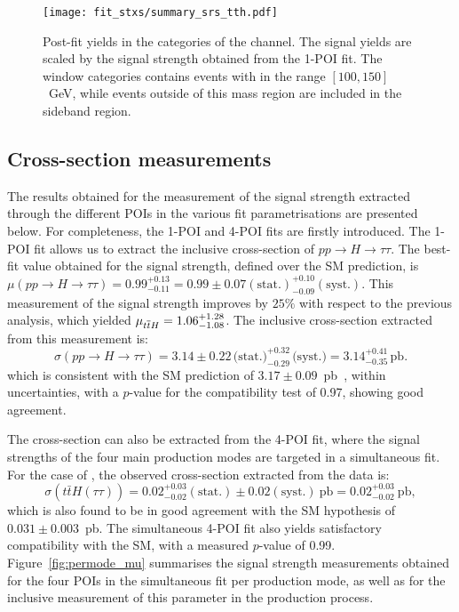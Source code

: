 \begin{figure}[htbp]
  \centering
  \texttt{[image: fit\_stxs/summary\_srs\_tth.pdf]}
  \caption{Post-fit yields in the \ttH categories of the \tauhadhad channel. The
  signal yields are scaled by the signal strength obtained from the 1-POI fit. The
  window categories contains events with \mtt in the range $[100, 150]$~GeV, while
  events outside of this mass region are included in the sideband region.}
  \label{fig:summary_all}
\end{figure}


\subsection{Cross-section measurements}
\label{xsect}

The results obtained for the measurement of the signal strength extracted through the different POIs in the various fit parametrisations are presented below. 
For completeness, the 1-POI and 4-POI fits are firstly introduced. The 1-POI fit allows us to extract the inclusive cross-section of $pp \to H \to \tau \tau$. The best-fit value obtained for the signal strength, defined over the SM prediction, is 
$\mu(pp \to H \to \tau \tau) = 0.99^{+0.13}_{-0.11} = 0.99 \pm 0.07 (\text{stat.})^{+0.10}_{-0.09}(\text{syst.})$. 
This measurement of the signal strength improves by $25\%$ with respect to the previous analysis, which yielded $\mu_{t\overline{t}H} = 1.06^{+1.28}_{-1.08}$. The inclusive cross-section extracted from this measurement is:
\begin{equation}
  \sigma(pp \to H \to \tau\tau) 
  = 3.14 \pm 0.22 \, \text{(stat.)}^{+0.32}_{-0.29} \, \text{(syst.)} 
  = 3.14^{+0.41}_{-0.35} \, \text{pb}.
  \label{eq:htautau_xs}
  \end{equation}
  which is consistent with the SM prediction of $3.17 \pm 0.09$~pb~\cite{https://doi.org/10.23731/cyrm-2017-002}, within uncertainties, with a $p$-value for the compatibility test of 0.97, showing good agreement. 

  The \ttHtt cross-section can also be extracted from the 4-POI fit, where the signal strengths of the four main production modes are targeted in a simultaneous fit. For the case of \ttH, the observed cross-section extracted from the data is:
\begin{equation}
  \sigma(t\bar{t}H(\tau\tau))
  = 0.02^{+0.03}_{-0.02}(\text{stat.}) \pm 0.02(\text{syst.})~\text{pb} 
  = 0.02^{+0.03}_{-0.02}~\text{pb},
\end{equation}
which is also found to be in good agreement with the SM hypothesis of $0.031 \pm 0.003$~pb. The simultaneous 4-POI fit also yields satisfactory compatibility with the SM, with a measured $p$-value of 0.99. Figure~\ref{fig:permode_mu} summarises the signal strength measurements obtained for the four POIs in the simultaneous fit per production mode, as well as for the inclusive measurement of this parameter in the \htautau production process.

